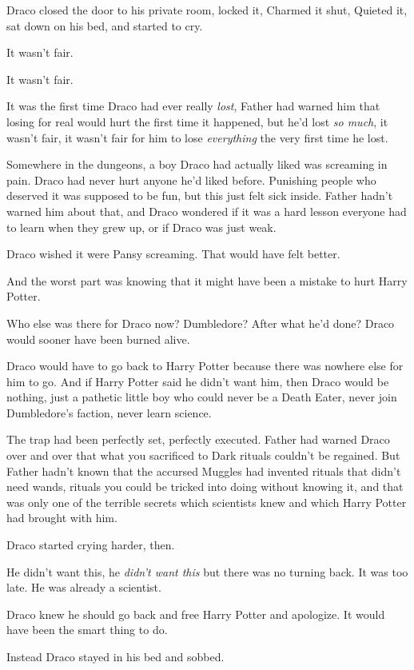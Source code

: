 Draco closed the door to his private room, locked it, Charmed it shut, Quieted
it, sat down on his bed, and started to cry.

It wasn't fair.

It wasn't fair.

It was the first time Draco had ever really \emph{lost}, Father had
warned him that losing for real would hurt the first time it happened, but he'd
lost \emph{so much}, it wasn't fair, it wasn't fair for him to lose
\emph{everything} the very first time he lost.

Somewhere in the dungeons, a boy Draco had actually liked was screaming in
pain. Draco had never hurt anyone he'd liked before. Punishing people who
deserved it was supposed to be fun, but this just felt sick inside. Father
hadn't warned him about that, and Draco wondered if it was a hard lesson
everyone had to learn when they grew up, or if Draco was just weak.

Draco wished it were Pansy screaming. That would have felt better.

And the worst part was knowing that it might have been a mistake to hurt Harry
Potter.

Who else was there for Draco now? Dumbledore? After what he'd done? Draco would
sooner have been burned alive.

Draco would have to go back to Harry Potter because there was nowhere else for
him to go. And if Harry Potter said he didn't want him, then Draco would be
nothing, just a pathetic little boy who could never be a Death Eater, never
join Dumbledore's faction, never learn science.

The trap had been perfectly set, perfectly executed. Father had warned Draco
over and over that what you sacrificed to Dark rituals couldn't be regained.
But Father hadn't known that the accursed Muggles had invented rituals that
didn't need wands, rituals you could be tricked into doing without knowing it,
and that was only one of the terrible secrets which scientists knew and which
Harry Potter had brought with him.

Draco started crying harder, then.

He didn't want this, he \emph{didn't want this} but there was no turning back.
It was too late. He was already a scientist.

Draco knew he should go back and free Harry Potter and apologize. It would have
been the smart thing to do.

Instead Draco stayed in his bed and sobbed.

